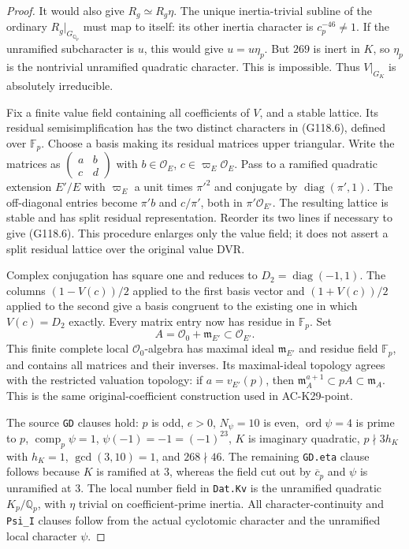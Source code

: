 \begin{proof}
It would also give $R_g\simeq R_g\eta$.
The unique inertia-trivial subline of the ordinary $R_g|_{G_{\mathbb Q_p}}$
must map to itself: its other inertia character is $c_p^{-46}\ne1$.
If the unramified subcharacter is $u$, this would give $u=u\eta_p$.
But $269$ is inert in $K$, so $\eta_p$ is the nontrivial unramified quadratic
character.  This is impossible.  Thus $V|_{G_K}$ is absolutely irreducible.

Fix a finite value field containing all coefficients of $V$, and a stable lattice.
Its residual semisimplification has the two distinct characters in (G118.6),
defined over $\mathbb F_p$.  Choose a basis making its residual matrices upper
triangular.  Write the matrices as $\left(\begin{smallmatrix}a&b\\c&d\end{smallmatrix}\right)$
with $b\in\mathcal O_E$, $c\in\varpi_E\mathcal O_E$.
Pass to a ramified quadratic extension $E'/E$ with
$\varpi_E$ a unit times $\pi'^2$ and conjugate by
$\operatorname{diag}(\pi',1)$.
The off-diagonal entries become $\pi'b$ and $c/\pi'$, both in
$\pi'\mathcal O_{E'}$.  The resulting lattice is stable and has split residual
representation.  Reorder its two lines if necessary to give (G118.6).
This procedure enlarges only the value field; it does not assert a split
residual lattice over the original value DVR.

Complex conjugation has square one and reduces to $D_2=\operatorname{diag}(-1,1)$.
The columns $(1-V(c))/2$ applied to the first basis vector and
$(1+V(c))/2$ applied to the second give a basis congruent to the existing one
in which $V(c)=D_2$ exactly.
Every matrix entry now has residue in $\mathbb F_p$.  Set
\[
                  A=\mathcal O_0+\mathfrak m_{E'}\subset\mathcal O_{E'}.
                                                        \tag{G118.19}
\]
This finite complete local $\mathcal O_0$-algebra has maximal ideal
$\mathfrak m_{E'}$ and residue field $\mathbb F_p$, and contains all matrices
and their inverses.  Its maximal-ideal topology agrees with the restricted
valuation topology: if $a=v_{E'}(p)$, then
$\mathfrak m_A^{a+1}\subset pA\subset\mathfrak m_A$.
This is the same original-coefficient construction used in AC-K29-point.

The source \texttt{GD} clauses hold: $p$ is odd, $e>0$, $N_\psi=10$ is even,
$\operatorname{ord}\psi=4$ is prime to $p$, $\operatorname{comp}_p\psi=1$,
$\psi(-1)=-1=(-1)^{23}$, $K$ is imaginary quadratic,
$p\nmid3h_K$ with $h_K=1$, $\gcd(3,10)=1$, and $268\nmid46$.
The remaining \texttt{GD.eta} clause follows because $K$ is ramified at $3$,
whereas the field cut out by $\overline c_p$ and $\psi$ is unramified at $3$.
The local number field in \texttt{Dat.Kv} is the unramified quadratic
$K_p/\mathbb Q_p$, with $\eta$ trivial on coefficient-prime inertia.
All character-continuity and \texttt{Psi\_I} clauses follow from the actual
cyclotomic character and the unramified local character $\psi$.


\end{proof}
